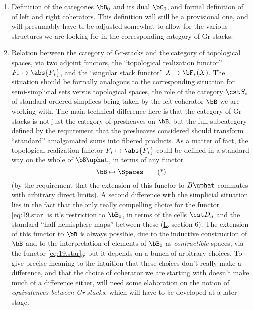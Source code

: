 \begin{enumerate}[label=\arabic*\textsuperscript{\b{o}})]
\item Definition of the categories $\bB_0$ and its dual $\bC_0$, and
  formal definition of of left and right coherators. This definition will
  still be a provisional one, and will presumably have to be adjusted
  somewhat to allow for the various structures we are looking for in
  the corresponding category of Gr-stacks.
\item Relation between the category of Gr-stacks and the category of
  topological spaces, via two adjoint functors, the ``topological
  realization functor'' $F_* \mapsto \abs{F_*}$, and the ``singular
  stack functor'' $X \mapsto \bF_*(X)$. The situation should be
  formally analogous to the corresponding situation for
  semi-simplicial sets versus topological spaces, the role of the
  category $\cst S_*$ of standard ordered simplices being taken by the
  left coherator $\bB$ we are working with. The main technical
  difference here is that the category of Gr-stacks is not just the
  category of presheaves on $\bB$, but the full subcategory defined
  by the requirement that the presheaves considered should transform
  ``standard'' amalgamated sums into fibered products. As a matter of
  fact, the topological realization functor $F_* \mapsto \abs{F_*}$
  could be defined in a standard way on the whole of $\bB\uphat$, in
  terms of any functor
  \begin{equation}
    \label{eq:19.star}
    \bB \mapsto \Spaces \tag{*}
  \end{equation}
  (by the requirement that the extension of this functor to $B\uphat$
  commutes with arbitrary direct limits). A second difference with
  the simplicial situation lies in the fact that the only really
  compelling choice for the functor \eqref{eq:19.star} is it's
  restriction to $\bB_0$, in terms of the cells $\cst D_n$ and the
  standard ``half-hemisphere maps'' between these (\hyperref[ch:I]{L},
  section 6). The
  extension of this functor to $\bB$ is always possible, due to the
  inductive construction of $\bB$ and to the interpretation of
  elements of $\bB_0$ as \emph{contractible} spaces, via the
  functor \eqref{eq:19.star}$_0$; but it depends on a bunch of
  arbitrary choices. To give precise meaning to the intuition that
  these choices don't really make a difference, and that the choice of
  coherator we are starting with doesn't make much of a difference
  either, will need some elaboration on the notion of \emph{equivalences
  between Gr-stacks}, which will have to be developed at
  a later stage.
\end{enumerate}

